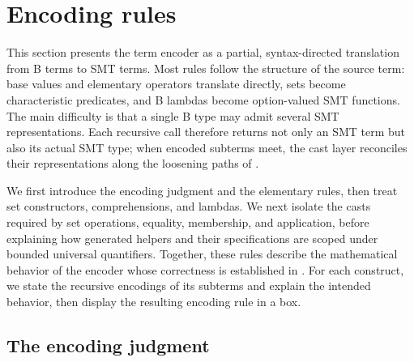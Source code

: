 \section{Encoding rules}
\label{sec:beer-encoding-rules}

This section presents the term encoder as a partial, syntax-directed translation from B terms to SMT terms.
Most rules follow the structure of the source term: base values and elementary operators translate directly, sets become characteristic predicates, and B lambdas become option-valued SMT functions.
The main difficulty is that a single B type may admit several SMT representations.
Each recursive call therefore returns not only an SMT term but also its actual SMT type; when encoded subterms meet, the cast layer reconciles their representations along the loosening paths of .

We first introduce the encoding judgment and the elementary rules, then treat set constructors, comprehensions, and lambdas.
We next isolate the casts required by set operations, equality, membership, and application, before explaining how generated helpers and their specifications are scoped under bounded universal quantifiers.
Together, these rules describe the mathematical behavior of the encoder whose correctness is established in .
For each construct, we state the recursive encodings of its subterms and explain the intended behavior, then display the resulting encoding rule in a box.

\subsection{The encoding judgment}
\label{sec:beer-encoding-judgment}

